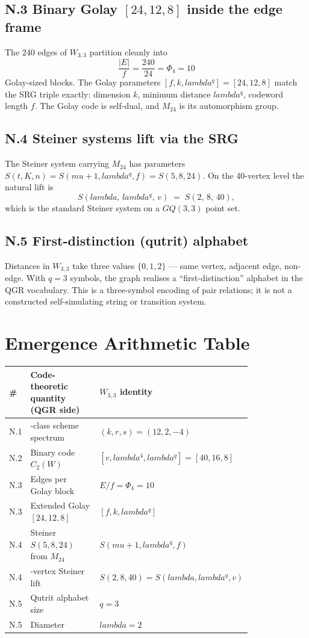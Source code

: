 \documentclass[12pt,a4paper]{article}
\def\mathrm#1{#1}%
\def\lambda{lambda}%
\def\mu{mu}%
\def\Phi#1{Phi#1}%
\theoremstyle{definition}
\newcommand{\GQ}{\mathrm{GQ}}
\begin{document}
\subsection*{N.3 \quad Binary Golay $[24,12,8]$ inside the edge frame}
The 240 edges of $W_{3,3}$ partition cleanly into
\[
\frac{|E|}{f} = \frac{240}{24} = \Phi_4 = 10
\]
Golay-sized blocks. The Golay parameters $[f,k,\lambda^q]=[24,12,8]$
match the SRG triple exactly: dimension $k$, minimum distance
$\lambda^q$, codeword length $f$. The Golay code is self-dual, and
$M_{24}$ is its automorphism group.

\subsection*{N.4 \quad Steiner systems lift via the SRG}
The Steiner system carrying $M_{24}$ has parameters
$S(t,K,n)=S(\mu+1,\lambda^q,f)=S(5,8,24)$. On the 40-vertex level the
natural lift is
\[
S(\lambda,\,\lambda^q,\,v) \;=\; S(2,\,8,\,40),
\]
which is the standard Steiner system on a $\GQ(3,3)$ point set.

\subsection*{N.5 \quad First-distinction (qutrit) alphabet}
Distances in $W_{3,3}$ take three values $\{0,1,2\}$ — same vertex,
adjacent edge, non-edge. With $q=3$ symbols, the graph realises a
``first-distinction'' alphabet in the QGR vocabulary.  This is a
three-symbol encoding of pair relations; it is not a constructed
self-simulating string or transition system.

\section*{Emergence Arithmetic Table}

\begin{center}
\small
\begin{tabular}{@{}>{\raggedleft\arraybackslash}p{0.07\linewidth}>{\raggedright\arraybackslash}p{0.45\linewidth}>{\raggedright\arraybackslash}p{0.28\linewidth}@{}}
\toprule
\# & Code-theoretic quantity (QGR side) & $W_{3,3}$ identity \\
\midrule
N.1 & 3-class scheme spectrum & $(k,r,s)=(12,2,-4)$ \\
N.2 & Binary code $C_2(W)$ & $[v,\lambda^{4},\lambda^{q}]=[40,16,8]$ \\
N.3 & Edges per Golay block & $E/f=\Phi_4=10$ \\
N.3 & Extended Golay $[24,12,8]$ & $[f,k,\lambda^{q}]$ \\
N.4 & Steiner $S(5,8,24)$ from $M_{24}$ & $S(\mu{+}1,\lambda^{q},f)$ \\
N.4 & 40-vertex Steiner lift & $S(2,8,40)=S(\lambda,\lambda^{q},v)$ \\
N.5 & Qutrit alphabet size & $q=3$ \\
N.5 & Diameter & $\lambda=2$ \\
\bottomrule
\end{tabular}
\end{center}
\end{document}
